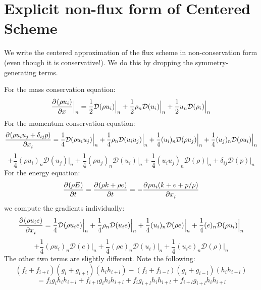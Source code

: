 \documentclass[12pt]{article}
\numberwithin{equation}{section}
\numberwithin{figure}{section}
\begin{document}
\section{Explicit non-flux form of Centered Scheme}

We write the centered approximation of the flux scheme in non-conservation form (even though it is conservative!). We do this
by dropping the symmetry-generating terms.

For the mass conservation equation:
\begin{equation}
\frac{\partial^{} (\rho u_i)}{\partial x^{}}\Big|_n = \frac{1}{2}\mathcal{D}(\rho u_i)\Big|_n + \frac{1}{2}\rho_n\mathcal{D}(u_i)\Big|_n + \frac{1}{2}u_n\mathcal{D}(\rho_i)\Big|_n
\end{equation}
For the momentum conservation equation:
\begin{equation*}
\frac{\partial^{} (\rho u_i u_j + \delta_{ij}p)}{\partial x_i^{}} = \frac{1}{4}\mathcal{D}(\rho u_i u_j)\Big|_n
+ \frac{1}{4}\rho_n\mathcal{D}(u_i u_j)\Big|_n
+ \frac{1}{4}(u_i)_n\mathcal{D}(\rho u_j)\Big|_n
+ \frac{1}{4}(u_j)_n\mathcal{D}(\rho u_i)\Big|_n
\end{equation*}
\begin{equation}
+ \frac{1}{4}(\rho u_i)_n\mathcal{D}(u_j)\Big|_n
+ \frac{1}{4}(\rho u_j)_n\mathcal{D}(u_i)\Big|_n
+ \frac{1}{4}(u_i u_j)_n\mathcal{D}(\rho)\Big|_n + \delta_{ij}\mathcal{D}(p)\Big|_n
\end{equation}
For the energy equation:
\begin{equation}
\frac{\partial^{} (\rho E)}{\partial t^{}} = \frac{\partial^{} (\rho k + \rho e)}{\partial t^{}} = -\frac{\partial^{} \rho u_i(k + e + p/\rho)}{\partial x_i^{}}
\end{equation}
we compute the gradients individually:
\begin{equation*}
\frac{\partial^{} (\rho u_i e)}{\partial x_i^{}} = \frac{1}{4}\mathcal{D}(\rho u_i e)\Big|_n
+ \frac{1}{4}\rho_n\mathcal{D}(u_i e)\Big|_n
+ \frac{1}{4}(u_i)_n\mathcal{D}(\rho e)\Big|_n
+ \frac{1}{4}(e)_n\mathcal{D}(\rho u_i)\Big|_n
\end{equation*}
\begin{equation}
+ \frac{1}{4}(\rho u_i)_n\mathcal{D}(e)\Big|_n
+ \frac{1}{4}(\rho e)_n\mathcal{D}(u_i)\Big|_n
+ \frac{1}{4}(u_i e)_n\mathcal{D}(\rho)\Big|_n
\end{equation}
The other two terms are slightly different. Note the following:
\begin{equation*}
(f_{i} + f_{i+l})(g_{i} + g_{i+l})(h_{i}h_{i+l}) - (f_{i} + f_{i-l})(g_{i} + g_{i-l})(h_{i}h_{i-l})
\end{equation*}
\begin{equation*}
= f_{i}g_{i}h_{i}h_{i+l} + f_{i+l}g_{i}h_{i}h_{i+l} + f_{i}g_{i+l}h_{i}h_{i+l} + f_{i+l}g_{i+l}h_{i}h_{i+l}
\end{equation*}
\end{document}
